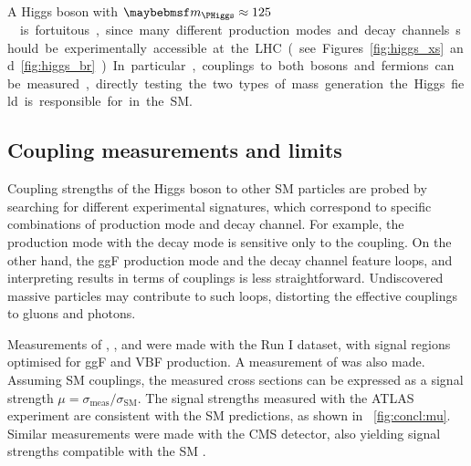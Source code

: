 A Higgs boson with \unit{$\mH \approx 125$}{\GeV} is fortuitous, 
since many different production modes and decay channels should be experimentally 
accessible at the LHC (see Figures~\ref{fig:higgs_xs} and \ref{fig:higgs_br}). In 
particular, couplings to both bosons and fermions can be measured, directly testing the 
two types of mass generation the Higgs field is responsible for in the SM.



\subsection{Coupling measurements and limits}
\label{sec:searches:couplings}

Coupling strengths of the Higgs boson to other SM particles are probed by searching for 
different experimental signatures, which correspond to specific combinations of 
production mode and decay channel. For example, the \WH production mode with the \HWW 
decay mode is sensitive only to the \HepProcess{\PHiggs\PW\PW} coupling. On the other 
hand, the ggF production mode and the \HepProcess{\PHiggs \HepTo \Pphoton\Pphoton} decay 
channel feature loops, and interpreting results in terms of couplings is less 
straightforward. Undiscovered massive particles may contribute to such loops, distorting 
the effective couplings to gluons and photons.

Measurements of \HepProcess{\PHiggs \HepTo \Pphoton\Pphoton}, \HepProcess{\PHiggs \HepTo 
\PZ\PZ}, \HWW and \HepProcess{\PHiggs \HepTo \Ptau\Ptau} were made with the Run I 
dataset, with signal regions optimised for ggF and VBF production. A measurement of 
\HepProcess{\PV\PHiggs \HepTo \PV\Pbottom\APbottom} was also made. Assuming SM couplings, 
the measured cross sections can be expressed as a signal strength $\mu = 
\sigma_{\text{meas}} / \sigma_{\text{SM}}$. The signal strengths measured with the ATLAS 
experiment are consistent with the SM predictions, as shown in \Figure~\ref{fig:concl:mu}.
Similar measurements were made with the CMS detector, also yielding signal strengths 
compatible with the SM \cite{CMS:Hgamgam,CMS:HZZ,CMS:HWW,CMS:Htautau,CMS:Hbb}.


